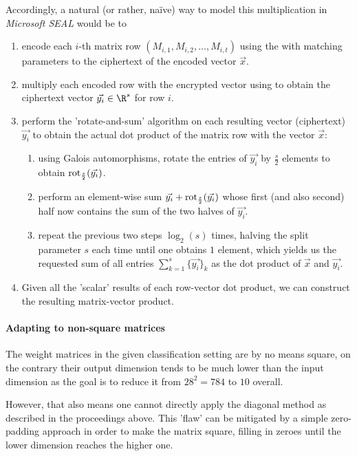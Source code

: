 Accordingly, a natural (or rather, naïve) way to model this multiplication in \textit{Microsoft SEAL} would be to
\begin{enumerate}
  \item encode each $i$-th matrix row $(M_{i,1}, M_{i,2}, ..., M_{i,t})$ using the 
        with matching parameters to the ciphertext of the encoded vector $\vec{x}$.
  \item multiply each encoded row with the encrypted vector using 
        to obtain the ciphertext vector $\vec{y_i} \in \R^s$ for row $i$.
  \item perform the 'rotate-and-sum' algorithm \parencite{2018-gazelle} on each
        resulting vector (ciphertext) $\vec{y_i}$ to obtain the actual dot product
        of the matrix row with the vector $\vec{x}$:
        \begin{enumerate}
          \item using Galois automorphisms, rotate the entries of $\vec{y_i}$ by $\frac{s}{2}$ elements
                to obtain $\mathrm{rot}_{\frac{s}{2}}(\vec{y_i})$.
          \item perform an element-wise sum $\vec{y_i} + \mathrm{rot}_{\frac{s}{2}}(\vec{y_i})$
                whose first (and also second) half now contains the sum of the two halves of $\vec{y_i}$.
          \item repeat the previous two steps $\log_2(s)$ times, halving the
                split parameter $s$ each time until one obtains $1$ element,
                which yields us the requested sum of all entries $\sum_{k=1}^s \{\vec{y_i}\}_k$
                as the dot product of $\vec{x}$ and $\vec{y_i}$.
        \end{enumerate}
  \item Given all the 'scalar' results of each row-vector dot product,
        we can construct the resulting matrix-vector product.
\end{enumerate}

\paragraph{Adapting to non-square matrices}
\label{subsec:non-square-matrices}
The weight matrices in the given classification setting are by no means square, on the contrary their output dimension tends to be much lower than the input dimension as the goal is to reduce it from $28^2 = 784$ to $10$ overall.

However, that also means one cannot directly apply the diagonal method as described in the proceedings above.
This 'flaw' can be mitigated by a simple zero-padding approach in order to make the matrix square, filling in zeroes until the lower dimension reaches the higher one.

